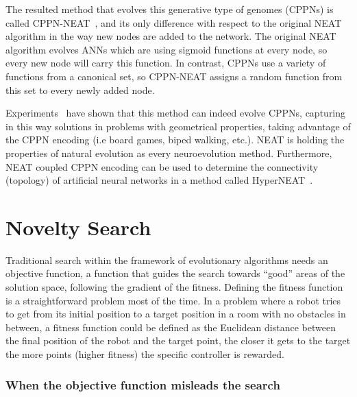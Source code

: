 The resulted method that evolves this generative type of genomes (CPPNs) is called CPPN-NEAT~\citep{stanley2007compositional}, and its only difference with respect to the original NEAT algorithm in the way new nodes are added to the network. The original NEAT algorithm evolves ANNs which are using sigmoid functions at every node, so every new node will carry this function.
In contrast, CPPNs use a variety of functions from a canonical set, so CPPN-NEAT assigns a random function from this set to every newly added node. 

Experiments~\citep{stanley2007compositional} have shown that this method can indeed evolve CPPNs, capturing in this way solutions in problems with geometrical properties, taking advantage of the CPPN encoding (i.e board games, biped walking, etc.). NEAT is holding the properties of natural evolution as every neuroevolution method. Furthermore, NEAT coupled CPPN encoding can be used to determine the connectivity (topology) of artificial neural networks in  a method called HyperNEAT~\citep{stanley2009hypercube}.




\section{Novelty Search}
\label{NoveltySearch}

Traditional search within the framework of evolutionary algorithms needs an objective function, a function that guides the search towards ``good'' areas of the solution space, following the gradient of the fitness. Defining the fitness function is a straightforward problem most of the time. In a problem where a robot tries to get from its initial position to a target position in a room with no obstacles in between, a fitness function could be defined as the Euclidean distance between the final position of the robot and the target point, the closer it gets to the target the more points (higher fitness) the specific controller is rewarded.

\subsubsection*{When the objective function misleads the search}

